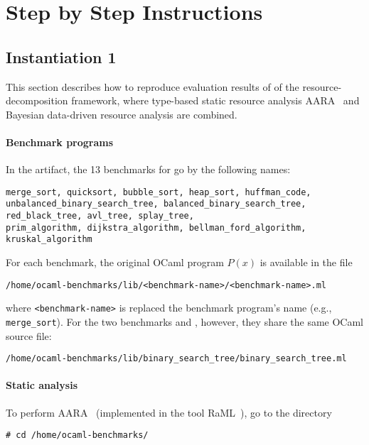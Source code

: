 
\section{Step by Step Instructions}
\label{sec:step-by-step-instructions}

\subsection{Instantiation 1}
\label{sec:step-by-step-instructions:instantiation-1}

This section describes how to reproduce evaluation results of
 of the resource-decomposition
framework, where type-based static resource analysis
AARA~\citep{Hoffmann2011a,Hoffmann2017} and Bayesian data-driven resource
analysis are combined.

\paragraph{Benchmark programs}

In the artifact, the 13 benchmarks for 
go by the following names:
\begin{verbatim}
merge_sort, quicksort, bubble_sort, heap_sort, huffman_code,
unbalanced_binary_search_tree, balanced_binary_search_tree,
red_black_tree, avl_tree, splay_tree,
prim_algorithm, dijkstra_algorithm, bellman_ford_algorithm, kruskal_algorithm
\end{verbatim}
%
For each benchmark, the original OCaml program $P(x)$ is available in the file
\begin{verbatim}
/home/ocaml-benchmarks/lib/<benchmark-name>/<benchmark-name>.ml
\end{verbatim}
where \texttt{<benchmark-name>} is replaced the benchmark program's name (e.g.,
\texttt{merge\_sort}).
%
For the two benchmarks \unbalancedbst{} and \balancedbst{}, however, they share
the same OCaml source file:
\begin{verbatim}
/home/ocaml-benchmarks/lib/binary_search_tree/binary_search_tree.ml
\end{verbatim}

\paragraph{Static analysis}

To perform AARA~\citep{Hoffmann2011a,Hoffmann2017} (implemented in the tool
RaML~\citep{RaML}), go to the directory
\begin{verbatim}
# cd /home/ocaml-benchmarks/
\end{verbatim}

